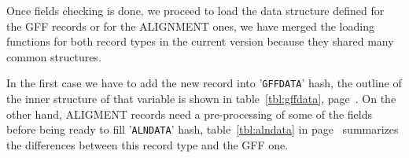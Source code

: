 \documentclass[11pt]{article}
\let\nwdocspar=\par                    %
\begin{document}

\nwenddocs{}%
%
\nwdocspar

Once fields checking is done, we proceed to load the data structure defined for the GFF records or for the ALIGNMENT ones, we have merged the loading functions for both record types in the current version because they shared many common structures. 

In the first case we have to add the new record into '{\tt{}{}GFF{}DATA}' hash, the outline of the inner structure of that variable is shown in table~\ref{tbl:gffdata}, page~\pageref{tbl:gffdata}. \label{sec:GFFhsh}
On the other hand, ALIGMENT records need a pre-processing of some of the fields before being ready to fill '{\tt{}{}ALN{}DATA}' hash, table~\ref{tbl:alndata} in page~\pageref{tbl:alndata} summarizes the differences between this record type and the GFF one. \label{sec:ALNhsh}
\end{document}
